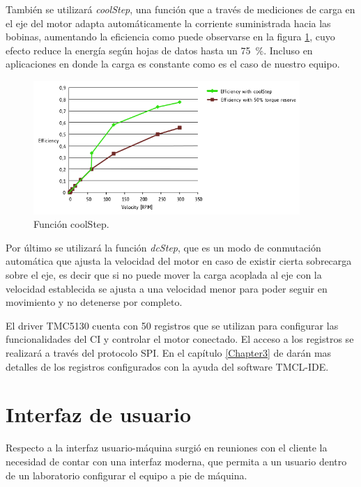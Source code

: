 También se utilizará \textit{coolStep}, una función que a través de mediciones de carga en el eje del motor adapta automáticamente la corriente suministrada hacia las bobinas, aumentando la eficiencia como puede observarse en la figura \ref{fig:tmc5130_coolStep}, cuyo efecto reduce la energía según hojas de datos \citep{3_web_trinamic_producto} hasta un \SI{75}{\percent}. Incluso en aplicaciones en donde la carga es constante como es el caso de nuestro equipo.

\begin{figure}[htpb]
\centering 
\includegraphics[width=0.9\textwidth]{./Figures/tmc5130_coolstep.png}
\caption{Función coolStep.}
\label{fig:tmc5130_coolStep}
\end{figure}

Por último se utilizará la función \textit{dcStep}, que es un modo de conmutación automática que ajusta la velocidad del motor en caso de existir cierta sobrecarga sobre el eje, es decir que si no puede mover la carga acoplada al eje con la velocidad establecida se ajusta a una velocidad menor para poder seguir en movimiento y no detenerse por completo. 


El driver TMC5130 cuenta con 50 registros que se utilizan para configurar las funcionalidades del CI y controlar el motor conectado. El acceso a los registros se realizará a través del protocolo SPI. En el capítulo \ref{Chapter3} de darán mas detalles de los registros configurados con la ayuda del software TMCL-IDE.  


\section{Interfaz de usuario}

Respecto a la interfaz usuario-máquina surgió en reuniones con el cliente la necesidad de contar con una interfaz moderna, que permita a un usuario dentro de un laboratorio configurar el equipo a pie de máquina. 

